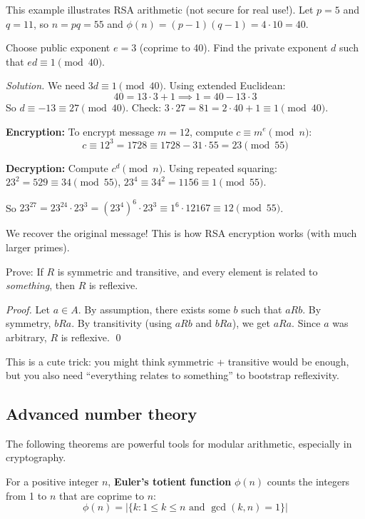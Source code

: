 \begin{example}
This example illustrates RSA arithmetic (not secure for real use!). Let $p = 5$ and $q = 11$, so $n = pq = 55$ and $\phi(n) = (p-1)(q-1) = 4 \cdot 10 = 40$.

Choose public exponent $e = 3$ (coprime to 40). Find the private exponent $d$ such that $ed \equiv 1 \pmod{40}$.

\emph{Solution.} We need $3d \equiv 1 \pmod{40}$. Using extended Euclidean:
\[
40 = 13 \cdot 3 + 1 \implies 1 = 40 - 13 \cdot 3
\]
So $d \equiv -13 \equiv 27 \pmod{40}$. Check: $3 \cdot 27 = 81 = 2 \cdot 40 + 1 \equiv 1 \pmod{40}$. \checkmark

\textbf{Encryption:} To encrypt message $m = 12$, compute $c \equiv m^e \pmod{n}$:
\[
c \equiv 12^3 = 1728 \equiv 1728 - 31 \cdot 55 = 23 \pmod{55}
\]

\textbf{Decryption:} Compute $c^d \pmod{n}$. Using repeated squaring:
$23^2 = 529 \equiv 34 \pmod{55}$, $23^4 \equiv 34^2 = 1156 \equiv 1 \pmod{55}$.

So $23^{27} = 23^{24} \cdot 23^3 = (23^4)^6 \cdot 23^3 \equiv 1^6 \cdot 12167 \equiv 12 \pmod{55}$.

We recover the original message! This is how RSA encryption works (with much larger primes).
\end{example}

\begin{example}
Prove: If $R$ is symmetric and transitive, and every element is related to \emph{something}, then $R$ is reflexive.

\emph{Proof.} Let $a \in A$. By assumption, there exists some $b$ such that $aRb$. By symmetry, $bRa$. By transitivity (using $aRb$ and $bRa$), we get $aRa$. Since $a$ was arbitrary, $R$ is reflexive. \qed

This is a cute trick: you might think symmetric + transitive would be enough, but you also need ``everything relates to something'' to bootstrap reflexivity.
\end{example}

\subsection*{Advanced number theory}

The following theorems are powerful tools for modular arithmetic, especially in cryptography.

\begin{definition}
For a positive integer $n$, \textbf{Euler's totient function} $\phi(n)$ counts the integers from 1 to $n$ that are coprime to $n$:
\[
\phi(n) = |\{k : 1 \leq k \leq n \text{ and } \gcd(k, n) = 1\}|
\]
\end{definition}

